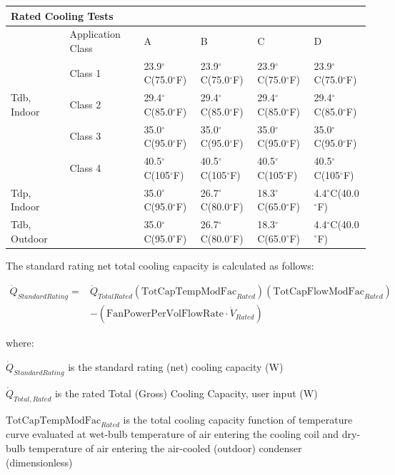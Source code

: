 \begin{longtable}[c]{p{1.0in}p{1.0in}p{1.0in}p{1.0in}p{1.0in}p{1.0in}}
\toprule
\multicolumn{6}{l}{Rated Cooling Tests} \tabularnewline \midrule
\endhead
& Application Class & A & B & C & D \tabularnewline
& Class 1 & 23.9\(^{\circ}\)C(75.0\(^{\circ}\)F) & 23.9\(^{\circ}\)C(75.0\(^{\circ}\)F) & 23.9\(^{\circ}\)C(75.0\(^{\circ}\)F) & 23.9\(^{\circ}\)C(75.0\(^{\circ}\)F) \tabularnewline
Tdb, Indoor & Class 2 & 29.4\(^{\circ}\)C(85.0\(^{\circ}\)F) & 29.4\(^{\circ}\)C(85.0\(^{\circ}\)F) & 29.4\(^{\circ}\)C(85.0\(^{\circ}\)F) & 29.4\(^{\circ}\)C(85.0\(^{\circ}\)F) \tabularnewline
& Class 3 & 35.0\(^{\circ}\)C(95.0\(^{\circ}\)F) & 35.0\(^{\circ}\)C(95.0\(^{\circ}\)F) & 35.0\(^{\circ}\)C(95.0\(^{\circ}\)F) & 35.0\(^{\circ}\)C(95.0\(^{\circ}\)F) \tabularnewline
& Class 4 & 40.5\(^{\circ}\)C(105\(^{\circ}\)F) & 40.5\(^{\circ}\)C(105\(^{\circ}\)F) & 40.5\(^{\circ}\)C(105\(^{\circ}\)F) & 40.5\(^{\circ}\)C(105\(^{\circ}\)F) \tabularnewline
Tdp, Indoor &  & 35.0\(^{\circ}\)C(95.0\(^{\circ}\)F) & 26.7\(^{\circ}\)C(80.0\(^{\circ}\)F) & 18.3\(^{\circ}\)C(65.0\(^{\circ}\)F) & 4.4\(^{\circ}\)C(40.0\(^{\circ}\)F) \tabularnewline
Tdb, Outdoor &  & 35.0\(^{\circ}\)C(95.0\(^{\circ}\)F) & 26.7\(^{\circ}\)C(80.0\(^{\circ}\)F) & 18.3\(^{\circ}\)C(65.0\(^{\circ}\)F) & 4.4\(^{\circ}\)C(40.0\(^{\circ}\)F) \tabularnewline
\bottomrule
\end{longtable}

The standard rating net total cooling capacity is calculated as follows:

\begin{equation}
\begin{array}{rl}
\dot{Q}_{StandardRating} =& \dot{Q}_{TotalRated}\left(\text{TotCapTempModFac}_{Rated}\right)\left(\text{TotCapFlowModFac}_{Rated}\right) \\
& - \left(\text{FanPowerPerVolFlowRate} \cdot \dot{V}_{Rated}\right)
\end{array}
\end{equation}

where:

\(\dot{Q}_{StandardRating}\) is the standard rating (net) cooling capacity (W)

\(\dot{Q}_{Total,Rated}\) is the rated Total (Gross) Cooling Capacity, user input (W)

\(\text{TotCapTempModFac}_{Rated}\) is the total cooling capacity function of temperature curve evaluated at wet-bulb temperature of air entering the cooling coil and dry-bulb temperature of air entering the air-cooled (outdoor) condenser (dimensionless)

